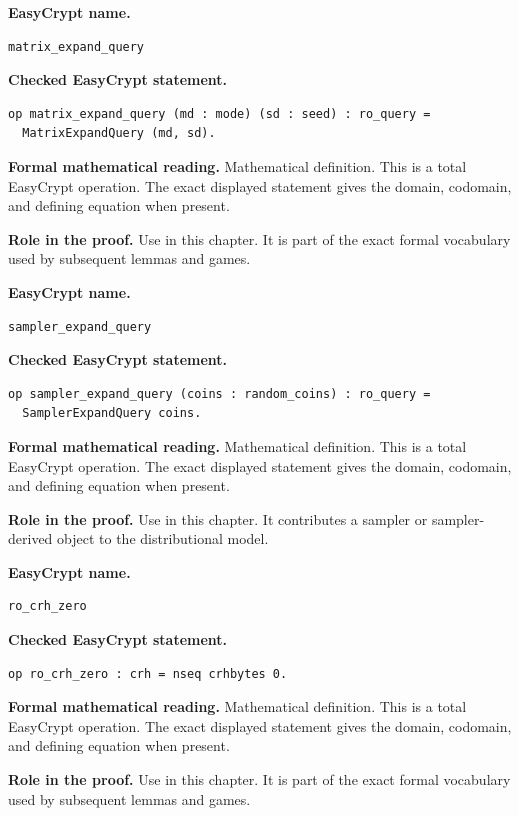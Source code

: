 \begin{formaldefinition}
\noindent\textbf{EasyCrypt name.}
\begin{lstlisting}[language=EasyCrypt,basicstyle=\ttfamily\scriptsize]
matrix_expand_query
\end{lstlisting}
\noindent\textbf{Checked EasyCrypt statement.}
\begin{lstlisting}[language=EasyCrypt,basicstyle=\ttfamily\scriptsize]
op matrix_expand_query (md : mode) (sd : seed) : ro_query =
  MatrixExpandQuery (md, sd).
\end{lstlisting}
\noindent\textbf{Formal mathematical reading.}
Mathematical definition. This is a total EasyCrypt operation.  The exact displayed statement gives the domain, codomain, and defining equation when present.

\noindent\textbf{Role in the proof.}
Use in this chapter. It is part of the exact formal vocabulary used by subsequent lemmas and games.

\end{formaldefinition}

\begin{formaldefinition}
\noindent\textbf{EasyCrypt name.}
\begin{lstlisting}[language=EasyCrypt,basicstyle=\ttfamily\scriptsize]
sampler_expand_query
\end{lstlisting}
\noindent\textbf{Checked EasyCrypt statement.}
\begin{lstlisting}[language=EasyCrypt,basicstyle=\ttfamily\scriptsize]
op sampler_expand_query (coins : random_coins) : ro_query =
  SamplerExpandQuery coins.
\end{lstlisting}
\noindent\textbf{Formal mathematical reading.}
Mathematical definition. This is a total EasyCrypt operation.  The exact displayed statement gives the domain, codomain, and defining equation when present.

\noindent\textbf{Role in the proof.}
Use in this chapter. It contributes a sampler or sampler-derived object to the distributional model.

\end{formaldefinition}

\begin{formaldefinition}
\noindent\textbf{EasyCrypt name.}
\begin{lstlisting}[language=EasyCrypt,basicstyle=\ttfamily\scriptsize]
ro_crh_zero
\end{lstlisting}
\noindent\textbf{Checked EasyCrypt statement.}
\begin{lstlisting}[language=EasyCrypt,basicstyle=\ttfamily\scriptsize]
op ro_crh_zero : crh = nseq crhbytes 0.
\end{lstlisting}
\noindent\textbf{Formal mathematical reading.}
Mathematical definition. This is a total EasyCrypt operation.  The exact displayed statement gives the domain, codomain, and defining equation when present.

\noindent\textbf{Role in the proof.}
Use in this chapter. It is part of the exact formal vocabulary used by subsequent lemmas and games.

\end{formaldefinition}

